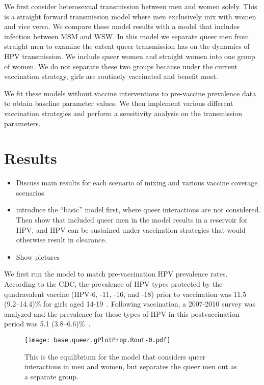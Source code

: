 \documentclass[12pt]{article}
\begin{document}
We first consider heterosexual transmission between men and women solely.  This is a straight forward transmission model where men exclusively mix with women and vice versa.  We compare these model results with a model that includes infection between MSM and WSW.  In this model we separate queer men from straight men to examine the extent queer transmission has on the dynamics of HPV transmission.  We include queer women and straight women into one group of women.  We do not separate these two groups because under the current vaccination strategy, girls are routinely vaccinated and benefit most. 

We fit these models without vaccine interventions to pre-vaccine prevalence data to obtain baseline parameter values.  We then implement various different vaccination strategies and perform a sensitivity analysis on the transmission parameters.  


\section{Results}
\begin{itemize}
\item Discuss main results for each scenario of mixing and various vaccine coverage scenarios
\item introduce the ``basic'' model first, where queer interactions are not considered.  Then show that included queer men in the model results in a reservoir for HPV, and HPV can be sustained under vaccination strategies that would otherwise result in clearance. 
\item Show pictures
\end{itemize}

We first run the model to match pre-vaccination HPV prevalence rates.  According to the CDC, the prevalence of HPV types protected by the quadravalent vaccine (HPV-6, -11, -16, and -18) prior to vaccination was 11.5 (9.2--14.4)\% for girls aged 14-19~\cite{Markowitz:2013}.  Following vaccination, a 2007-2010 survey was analyzed and the prevalence for these types of HPV in this postvaccination period was 5.1 (3.8--6.6)\%~\cite{Markowitz:2013}.

\begin{figure}[h!]
\begin{center}
\texttt{[image: base.queer.gPlotProp.Rout-0.pdf]}
\caption{This is the equilibrium for the model that considers queer interactions in men and women, but separates the queer men out as a separate group.}
\label{fig:QueerNoVacc}
\end{center}
\end{figure}
\end{document}
